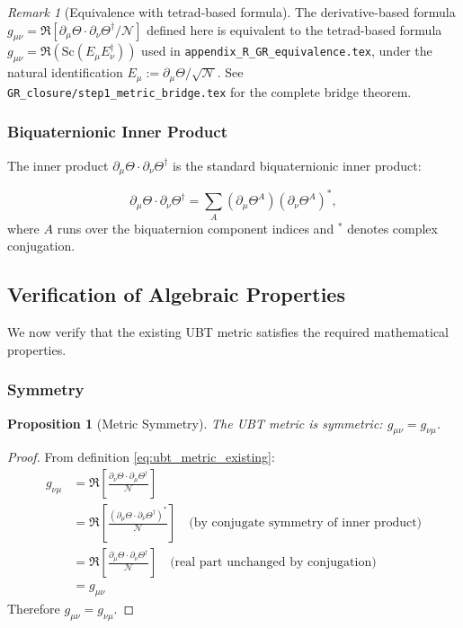\documentclass[12pt]{article}
\newtheorem{proposition}[theorem]{Proposition}
\theoremstyle{definition}
\theoremstyle{remark}
\newtheorem{remark}[theorem]{Remark}
\begin{document}
\begin{remark}[Equivalence with tetrad-based formula]
\label{rem:bridge_FORMAL}
The derivative-based formula $g_{\mu\nu} = \Re[\partial_\mu\Theta\cdot\partial_\nu\Theta^\dagger/\mathcal{N}]$
defined here is equivalent to the tetrad-based formula
$g_{\mu\nu} = \Re(\mathrm{Sc}(E_\mu E_\nu^\dagger))$ used in
\texttt{appendix\_R\_GR\_equivalence.tex}, under the natural identification
$E_\mu := \partial_\mu\Theta/\sqrt{\mathcal{N}}$.
See \texttt{GR\_closure/step1\_metric\_bridge.tex} for the complete bridge theorem.
\end{remark}

\subsubsection{Biquaternionic Inner Product}

The inner product $\partial_\mu \Theta \cdot \partial_\nu \Theta^\dagger$ is the standard biquaternionic inner product:

\begin{equation}
\partial_\mu \Theta \cdot \partial_\nu \Theta^\dagger = \sum_{A} (\partial_\mu \Theta^A)(\partial_\nu \Theta^A)^*,
\end{equation}
where $A$ runs over the biquaternion component indices and $^*$ denotes complex conjugation.

\subsection{Verification of Algebraic Properties}

We now verify that the existing UBT metric satisfies the required mathematical properties.

\subsubsection{Symmetry}

\begin{proposition}[Metric Symmetry]
The UBT metric is symmetric: $g_{\mu\nu} = g_{\nu\mu}$.
\end{proposition}

\begin{proof}
From definition \eqref{eq:ubt_metric_existing}:
\begin{align}
g_{\nu\mu} &= \Re\left[ \frac{\partial_\nu \Theta \cdot \partial_\mu \Theta^\dagger}{\mathcal{N}} \right] \\
&= \Re\left[ \frac{(\partial_\mu \Theta \cdot \partial_\nu \Theta^\dagger)^*}{\mathcal{N}} \right] \quad \text{(by conjugate symmetry of inner product)} \\
&= \Re\left[ \frac{\partial_\mu \Theta \cdot \partial_\nu \Theta^\dagger}{\mathcal{N}} \right] \quad \text{(real part unchanged by conjugation)} \\
&= g_{\mu\nu}
\end{align}
Therefore $g_{\mu\nu} = g_{\nu\mu}$.
\end{proof}
\end{document}
